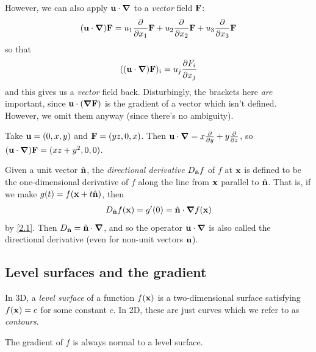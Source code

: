 \documentclass{../../template/note}
\begin{document}
    However, we can also apply \(\V u \cdot \grad\) to a \emph{vector} field \(\V F\):
    \begin{align*}
        (\V u \cdot \grad) \V F = u_1 \pd{}{x_1} \V F + u_2 \pd{}{x_2} \V F + u_3 \pd{}{x_3} \V F
    \end{align*}
    so that
    \begin{align*}
        ((\V u \cdot \grad) \V F)_i = u_j \pd{F_i}{x_j}
    \end{align*}
    and this gives us a \emph{vector} field back. Disturbingly, the brackets here \emph{are} important, since \(\V u \cdot (\grad \V F)\) is the gradient of a vector which isn't defined. However, we omit them anyway (since there's no ambiguity).
    
    \begin{example*}
        Take \(\V u = (0, x, y)\) and \(\V F = (yz, 0, x)\). Then \(\V u \cdot \grad = x \pd{}{y} + y \pd{}{z}\), so \((\V u \cdot \grad) \V F = (xz + y^2, 0, 0)\).
    \end{example*}
    
    \begin{definition*}
        Given a unit vector \(\hvec n\), the \emph{directional derivative} \(D_{\hvec n}f\) of \(f\) at \(\V x\) is defined to be the one-dimensional derivative of \(f\) along the line from \(\V x\) parallel to \(\hvec n\). That is, if we make \(g(t) = f(\V x + t \hvec n)\), then
        \begin{align*}
            D_{\hvec n}f(\V x) = g'(0) = \hvec n \cdot \grad f(\V x)
        \end{align*}
        by \cref{2.1}. Then \(D_{\hvec n} = \hvec n \cdot \grad\), and so the operator \(\V u \cdot \grad\) is also called the directional derivative (even for non-unit vectors \(\V u\)).    
    \end{definition*}
    
    \subsection{Level surfaces and the gradient}

    \begin{definition*}
        In 3D, a \emph{level surface} of a function \(f(\V x)\) is a two-dimensional surface satisfying \(f(\V x) = c\) for some constant \(c\). In 2D, these are just curves which we refer to as \emph{contours}.
    \end{definition*}
    
    \begin{proposition*}
        The gradient of \(f\) is always normal to a level surface.
    \end{proposition*}
    
\end{document}
